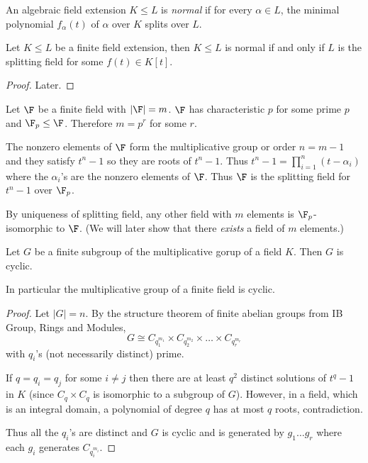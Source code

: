 \documentclass[a4paper]{article}
\begin{document}
\begin{definition}
  An algebraic field extension \(K \leq L\) is \emph{normal} if for every \(\alpha \in L\), the minimal polynomial \(f_\alpha(t)\) of \(\alpha\) over \(K\) splits over \(L\).
\end{definition}

\begin{theorem}
  Let \(K \leq L\) be a finite field extension, then \(K \leq L\) is normal if and only if \(L\) is the splitting field for some \(f(t) \in K[t]\).
\end{theorem}

\begin{proof}
  Later.
\end{proof}

\begin{eg}
  Let \(\F\) be a finite field with \(|\F| = m\). \(\F\) has characteristic \(p\) for some prime \(p\) and \(\F_p \leq \F\). Therefore \(m = p^r\) for some \(r\).

  The nonzero elements of \(\F\) form the multiplicative group or order \(n = m - 1\) and they satisfy \(t^n - 1\) so they are roots of \(t^n - 1\). Thus \(t^n - 1 = \prod_{i = 1}^n (t - \alpha_i)\) where the \(\alpha_i\)'s are the nonzero elements of \(\F\). Thus \(\F\) is the splitting field for \(t^n - 1\) over \(\F_p\).

  By uniqueness of splitting field, any other field with \(m\) elements is \(\F_p\)-isomorphic to \(\F\). (We will later show that there \emph{exists} a field of \(m\) elements.)
\end{eg}

\begin{theorem}
  Let \(G\) be a finite subgroup of the multiplicative gorup of a field \(K\). Then \(G\) is cyclic.

  In particular the multiplicative group of a finite field is cyclic.
\end{theorem}

\begin{proof}
  Let \(|G| = n\). By the structure theorem of finite abelian groups from IB Group, Rings and Modules,
  \[
    G \cong C_{q_1^{m_1}} \times C_{q_2^{m_2}} \times \dots \times C_{q_r^{m_r}}
  \]
  with \(q_i\)'s (not necessarily distinct) prime.

  If \(q = q_i = q_j\) for some \(i \neq j\) then there are at least \(q^2\) distinct solutions of \(t^q - 1\) in \(K\) (since \(C_q \times C_q\) is isomorphic to a subgroup of \(G\)). However, in a field, which is an integral domain, a polynomial of degree \(q\) has at most \(q\) roots, contradiction.

  Thus all the \(q_i\)'s are distinct and \(G\) is cyclic and is generated by \(g_1 \dots g_r\) where each \(g_i\) generates \(C_{q_i^{m_i}}\).
\end{proof}
\end{document}
